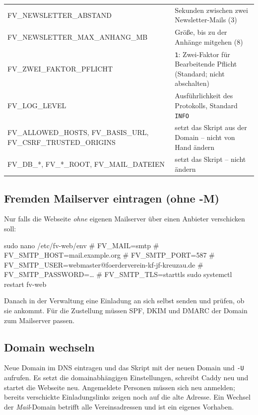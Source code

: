 \documentclass[a4paper,fontsize=10pt]{scrartcl}
\newcommand*{\cmd}[1]{\texttt{#1}}
\begin{document}
\begin{center}
\begin{tabularx}{\textwidth}{@{}>{\ttfamily\raggedright}p{52mm}X@{}}
FV\_NEWSLETTER\_ABSTAND    & Sekunden zwischen zwei Newsletter-Mails (3) \\
FV\_NEWSLETTER\_MAX\_ANHANG\_MB & Größe, bis zu der Anhänge mitgehen (8) \\
FV\_ZWEI\_FAKTOR\_PFLICHT  & \cmd{1}: Zwei-Faktor für Bearbeitende Pflicht (Standard; nicht abschalten) \\
FV\_LOG\_LEVEL             & Ausführlichkeit des Protokolls, Standard \cmd{INFO} \\
\midrule
FV\_ALLOWED\_HOSTS, FV\_BASIS\_URL, FV\_CSRF\_TRUSTED\_ORIGINS & setzt das Skript aus der
                             Domain -- nicht von Hand ändern \\
FV\_DB\_*, FV\_*\_ROOT, FV\_MAIL\_DATEIEN & setzt das Skript -- nicht ändern \\
\bottomrule
\end{tabularx}
\end{center}

\subsection{Fremden Mailserver eintragen (ohne -M)}

Nur falls die Webseite \emph{ohne} eigenen Mailserver über einen Anbieter verschicken
soll:

\begin{befehl}
sudo nano /etc/fv-web/env
#   FV_MAIL=smtp
#   FV_SMTP_HOST=mail.example.org
#   FV_SMTP_PORT=587
#   FV_SMTP_USER=webmaster@foerderverein-kf-jf-kreuzau.de
#   FV_SMTP_PASSWORD=…
#   FV_SMTP_TLS=starttls
sudo systemctl restart fv-web
\end{befehl}

Danach in der Verwaltung eine Einladung an sich selbst senden und prüfen, ob sie
ankommt. Für die Zustellung müssen SPF, DKIM und DMARC der Domain zum Mailserver
passen.

\subsection{Domain wechseln}

Neue Domain im DNS eintragen und das Skript mit der neuen Domain und \cmd{-U} aufrufen.
Es setzt die domainabhängigen Einstellungen, schreibt Caddy neu und startet die
Webseite neu. Angemeldete Personen müssen sich neu anmelden; bereits verschickte
Einladungslinks zeigen noch auf die alte Adresse. Ein Wechsel der \emph{Mail}-Domain
betrifft alle Vereinsadressen und ist ein eigenes Vorhaben.
\end{document}
